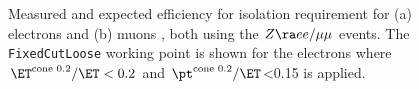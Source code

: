 \begin{figure}[h]
  \centering
    \caption{ Measured and expected efficiency for isolation requirement for (a) electrons\cite{156_ElectronEffMeas_2015data} and (b) muons \cite{166_muonPerformance2015data}, both using the $Z\ra ee/\mu\mu$ events.
      The \texttt{FixedCutLoose} working point is shown for the electrons where $\etcone/\ET<0.2$ and $\ptcone/\ET$<0.15 is applied.
      \label{fig::objDef::isoEff} }
\end{figure}




